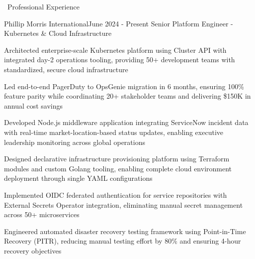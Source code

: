 \documentclass{resume} %
\begin{document}
\begin{rSection}{{\color{sectioncolor}\faBriefcase}\ Professional Experience}
\smallbreak
\begin{rSubsection}{Phillip Morris International}{June 2024 - Present}
{Senior Platform Engineer - Kubernetes \& Cloud Infrastructure}{}
\normalfont
\item Architected enterprise-scale Kubernetes platform using Cluster API with integrated day-2 operations tooling, providing 50+ development teams with standardized, secure cloud infrastructure
\item Led end-to-end PagerDuty to OpsGenie migration in 6 months, ensuring 100\% feature parity while coordinating 20+ stakeholder teams and delivering \$150K in annual cost savings
\item Developed Node.js middleware application integrating ServiceNow incident data with real-time market-location-based status updates, enabling executive leadership monitoring across global operations
\item Designed declarative infrastructure provisioning platform using Terraform modules and custom Golang tooling, enabling complete cloud environment deployment through single YAML configurations
\item Implemented OIDC federated authentication for service repositories with External Secrets Operator integration, eliminating manual secret management across 50+ microservices
\item Engineered automated disaster recovery testing framework using Point-in-Time Recovery (PITR), reducing manual testing effort by 80\% and ensuring 4-hour recovery objectives
\end{rSubsection}


\end{rSection}
\end{document}
